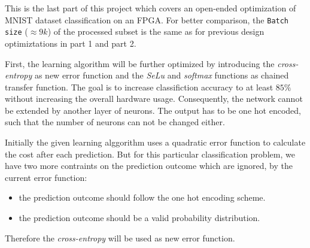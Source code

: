 \documentclass[../main.tex]{subfiles}
\begin{document}
This is the last part of this project which covers an open-ended optimization of MNIST dataset classification on an FPGA. 
For better comparison, the \texttt{Batch size} ($\approx 9k$) of the processed subset is the same as for previous design optimiztations in part 1 and part 2.

First, the learning algorithm will be further optimized by introducing the \textit{cross-entropy} as new error function and the \textit{SeLu} and \textit{softmax} functions as chained transfer function. The goal is to increase classifiction accuracy to at least $85\percent$ without increasing the overall hardware usage.
Consequently, the network cannot be extended by another layer of neurons. The output has to be one hot encoded, such that the number of neurons can not be changed either.

Initially the given learning alggorithm uses a quadratic error function to calculate the cost after each prediction. But for this particular classification problem, we have two more contraints on the prediction outcome which are ignored, by the current error function:
\begin{itemize}
	\item the prediction outcome should follow the one hot encoding scheme.
	\item the prediction outcome should be a valid probability distribution.
\end{itemize}
Therefore the \textit{cross-entropy} will be used as new error function.
\begin{align}
\end{align}
\end{document}
